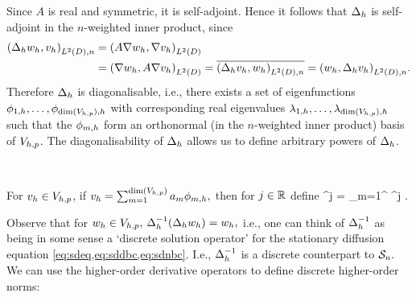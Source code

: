 Since $A$ is real and symmetric, it is self-adjoint. Hence it follows that $\Delta_{h}$ is self-adjoint in the $n$-weighted inner product, since
\begin{align*}
  \IPLtDn{\Deltah \wh}{\vh} &= \IPLtD{A \grad \wh}{\grad \vh}\\
  &= \IPLtD{\grad \wh}{A\grad \vh} = \overline{\IPLtDn{\Deltah \vh}{\wh}} = \IPLtDn{\wh}{\Deltah \vh}.
\end{align*}
Therefore $\Delta_{h}$ is diagonalisable, i.e., there exists a set of eigenfunctions $\phioh,\ldots,\phidimVhph$  with corresponding real eigenvalues $\lambdaoh, \ldots, \lambdadimVhph$ such that the $\phi_{m,h}$ form an orthonormal (in the $n$-weighted inner product) basis of $V_{h,p}$. The diagonalisability of $\Delta_{h}$ allows us to define arbitrary powers of $\Delta_{h}$.

\label{def:hodd}

\

\noindent For $v_{h} \in V_{h,p}$, if $\vh = \sum_{m=1}^{\dimVhp} \am \phimh,$ then for $j \in \mathbb R$ define
\beqs
\Deltah^j \vh = \sum_{m=1}^{\dimVhp} \lambdamh^j \am \phimh.
\eeqs


\ede
Observe that for $w_{h} \in V_{h,p},$ $\DeltahI\mleft(\Deltah\wh\mright) = \wh,$ i.e., one can think of $\Delta_{h}^{-1}$ as being in some sense a `discrete solution operator' for the stationary diffusion equation \cref{eq:sdeq,eq:sddbc,eq:sdnbc}. I.e., $\Delta_{h}^{-1}$ is a discrete counterpart to $\mathcal S_{n}.$
We can use the higher-order derivative operators to define discrete higher-order norms:

